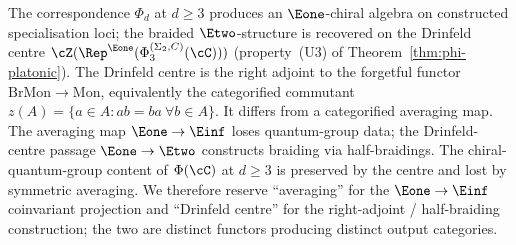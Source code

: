\providecommand{\Kuz}{\mathrm{Ku}}

\begin{remark}
\label{rem:cy-cat-drinfeld-center-not-averaging}
The correspondence $\Phi_d$ at $d \geq 3$ produces an $\Eone$-chiral algebra on constructed specialisation loci; the braided $\Etwo$-structure is recovered on the Drinfeld centre $\cZ(\Rep^{\Eone}(\Phi_3^{(\Sigma_2,C)}(\cC)))$ (property~\textup{(U3)} of Theorem~\textup{\ref{thm:phi-platonic}}). The Drinfeld centre is the right adjoint to the forgetful functor $\mathrm{BrMon} \to \mathrm{Mon}$, equivalently the categorified commutant $z(A) = \{a \in A: ab = ba\ \forall b \in A\}$. It differs from a categorified averaging map. The averaging map $\Eone \to \Einf$ loses quantum-group data; the Drinfeld-centre passage $\Eone \to \Etwo$ constructs braiding via half-braidings. The chiral-quantum-group content of $\Phi(\cC)$ at $d \geq 3$ is preserved by the centre and lost by symmetric averaging. We therefore reserve ``averaging'' for the $\Eone \to \Einf$ coinvariant projection and ``Drinfeld centre'' for the right-adjoint / half-braiding construction; the two are distinct functors producing distinct output categories.
\end{remark}

